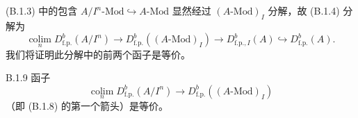 (B.1.3) 中的包含 $A/I^n\text{-}\mathrm{Mod}\hookrightarrow A\text{-}\mathrm{Mod}$ 显然经过 $(A\text{-}\mathrm{Mod})_I$ 分解，故 (B.1.4) 分解为
\begin{equation}\tag{B.1.8}\label{eq:a4-18-4}
\operatorname*{colim}_n D^b_{\mathrm{f.p.}}(A/I^n)\to D^b_{\mathrm{f.p.}}((A\text{-}\mathrm{Mod})_I)\to D^b_{\mathrm{f.p.},I}(A)\hookrightarrow D^b_{\mathrm{f.p.}}(A).
\end{equation}
我们将证明此分解中的前两个函子是等价。

\begin{prop}{B.1.9}\label{thm:a4-18-18}
函子
\begin{equation}\tag{B.1.10}\label{eq:a4-18-5}
\operatorname*{colim}_n D^b_{\mathrm{f.p.}}(A/I^n)\to D^b_{\mathrm{f.p.}}((A\text{-}\mathrm{Mod})_I)
\end{equation}
（即 (B.1.8) 的第一个箭头）是等价。
\end{prop}
